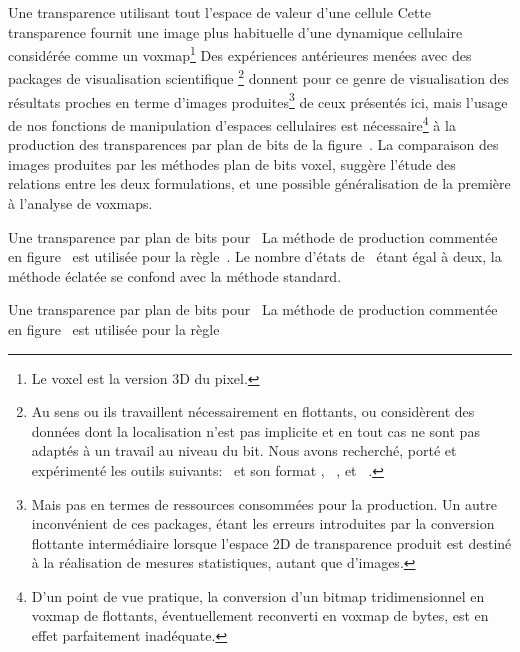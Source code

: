 %
{}%
{Une transparence utilisant tout l'espace de valeur d'une cellule}%
{Cette transparence fournit une image plus habituelle d'une
  dynamique cellulaire consid\'er\'ee comme un voxmap\footnote{%
    Le voxel est la version 3D du pixel.} %
  Des exp\'eriences ant\'erieures men\'ees avec des packages de visualisation
  scientifique \footnote{%
    Au sens ou ils travaillent n\'ecessairement en flottants, ou consid\`erent
    des donn\'ees dont la localisation n'est pas implicite
    et en tout cas ne sont pas adapt\'es \`a un travail au niveau du bit. %
    Nous avons recherch\'e, port\'e et exp\'eriment\'e les outils suivants:~%
     et son format %
    , %
    ~\cite[]{Hibbard94}, %
     et %
    ~\cite[]{Cabral93}.} %
  donnent pour ce genre de visualisation des r\'esultats proches en terme
  d'images produites\footnote{%
    Mais pas en termes de ressources consomm\'ees pour la production. %
    Un autre inconv\'enient de ces packages, \'etant les erreurs
    introduites par la conversion flottante interm\'ediaire lorsque
    l'espace 2D de transparence produit est destin\'e \`a la r\'ealisation
    de mesures statistiques, autant que d'images.} %
  de ceux pr\'esent\'es ici, %
  mais l'usage de nos fonc\-tions de manipulation d'espaces cellulaires
  est n\'ecessaire\footnote{%
    D'un point de vue pratique, la conversion d'un bitmap
    tridimensionnel en voxmap de flottants, \'eventuellement reconverti
    en voxmap de bytes, est en effet parfaitement inad\'equate.} %
  \`a la pro\-duc\-tion des transparences par plan de bits de
  la figure~. %
  La comparaison des images produites par les m\'ethodes plan de bits
  \vs voxel, sugg\`ere l'\'etude des relations entre les deux
  formulations, et une possible g\'en\'eralisation de la premi\`ere \`a
  l'analyse de voxmaps.} %

%
{}%
{Une transparence par plan de bits pour~}%
{La m\'ethode de production comment\'ee en
  figure~ est utilis\'ee 
  pour la r\`egle~. %
  Le nombre d'\'etats de~ \'etant \'egal \`a deux, la m\'ethode
  \'eclat\'ee se confond avec la m\'ethode standard.}

%
{}%
{Une transparence par plan de bits pour~}%
{La m\'ethode de production comment\'ee en
  figure~ est utilis\'ee 
  pour la r\`egle~}

